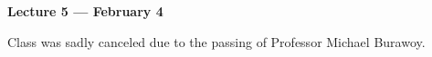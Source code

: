 \vspace{3mm}
\noindent \textbf{Lecture 5 --- February 4\th}

Class was sadly canceled due to the passing of Professor Michael Burawoy.

